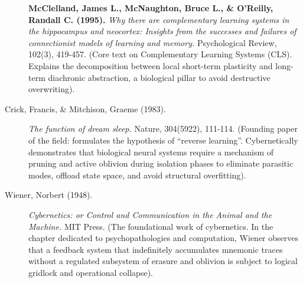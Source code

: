 \documentclass[11pt,a4paper,oneside]{article} %
\begin{document}
\begin{description}
\item[] \textbf{McClelland, James L., McNaughton, Bruce L., \& O'Reilly, Randall C. (1995).} \emph{Why there are complementary learning systems in the hippocampus and neocortex: Insights from the successes and failures of connectionist models of learning and memory.} Psychological Review, 102(3), 419-457. (Core text on Complementary Learning Systems (CLS). Explains the decomposition between local short-term plasticity and long-term diachronic abstraction, a biological pillar to avoid destructive overwriting).
\end{description}

\hypertarget{a1.6-economy-of-oblivion-and-regularization-of-state-space}{%
\label{a1.6-economy-of-oblivion-and-regularization-of-state-space}}

\begin{description}
\item[Crick, Francis, \& Mitchison, Graeme (1983).] \emph{The function of dream sleep.} Nature, 304(5922), 111-114. (Founding paper of the field: formulates the hypothesis of ``reverse learning''. Cybernetically demonstrates that biological neural systems require a mechanism of pruning and active oblivion during isolation phases to eliminate parasitic modes, offload state space, and avoid structural overfitting).

\item[Wiener, Norbert (1948).] \emph{Cybernetics: or Control and Communication in the Animal and the Machine.} MIT Press. (The foundational work of cybernetics. In the chapter dedicated to psychopathologies and computation, Wiener observes that a feedback system that indefinitely accumulates mnemonic traces without a regulated subsystem of erasure and oblivion is subject to logical gridlock and operational collapse).
\end{description}

\hypertarget{a1.7-cognitive-mirroring-and-theory-of-mind}{%
\label{a1.7-cognitive-mirroring-and-theory-of-mind}}
\end{document}
